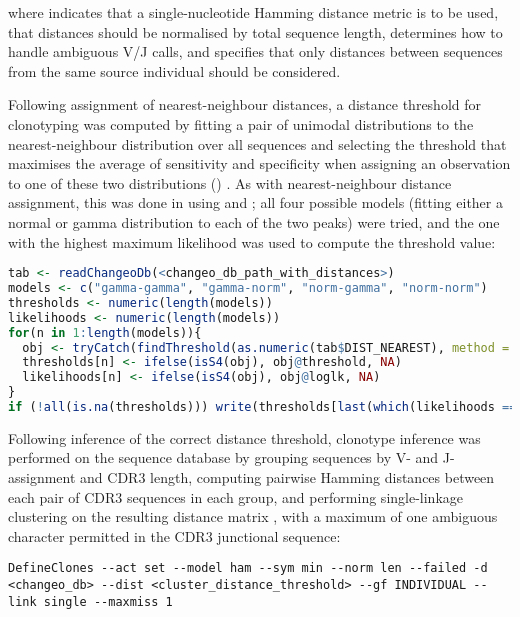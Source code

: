 \noindent where  indicates that a single-nucleotide Hamming distance metric is to be used,  that distances should be normalised by total sequence length,  determines how to handle ambiguous V/J calls, and  specifies that only distances between sequences from the same source individual should be considered.

Following assignment of nearest-neighbour distances, a distance threshold for clonotyping was computed by fitting a pair of unimodal distributions to the nearest-neighbour distribution over all sequences and selecting the threshold that maximises the average of sensitivity and specificity when assigning an observation to one of these two distributions () \parencite{nouri2018threshold}. As with nearest-neighbour distance assignment, this was done in  using  and ; all four possible models (fitting either a normal or gamma distribution to each of the two peaks) were tried, and the one with the highest maximum likelihood was used to compute the threshold value:

\begin{lstlisting}[language=R]
tab <- readChangeoDb(<changeo_db_path_with_distances>)
models <- c("gamma-gamma", "gamma-norm", "norm-gamma", "norm-norm")
thresholds <- numeric(length(models))
likelihoods <- numeric(length(models))
for(n in 1:length(models)){
  obj <- tryCatch(findThreshold(as.numeric(tab$DIST_NEAREST), method = "gmm", model = "hmm", cutoff = "opt"), error = function(e) return(e$message), warning = function(w) return(w$message))
  thresholds[n] <- ifelse(isS4(obj), obj@threshold, NA)
  likelihoods[n] <- ifelse(isS4(obj), obj@loglk, NA)
}
if (!all(is.na(thresholds))) write(thresholds[last(which(likelihoods == max(likelihoods, na.rm = TRUE))], <threshold_output_path>)
\end{lstlisting} 

\noindent Following inference of the correct distance threshold, clonotype inference was performed on the sequence database by grouping sequences by V- and J-assignment and CDR3 length, computing pairwise Hamming distances between each pair of CDR3 sequences in each group, and performing single-linkage clustering on the resulting distance matrix \parencite{gupta2017hierarchical}, with a maximum of one ambiguous  character permitted in the CDR3 junctional sequence:

\begin{lstlisting}
DefineClones --act set --model ham --sym min --norm len --failed -d <changeo_db> --dist <cluster_distance_threshold> --gf INDIVIDUAL --link single --maxmiss 1
\end{lstlisting}

